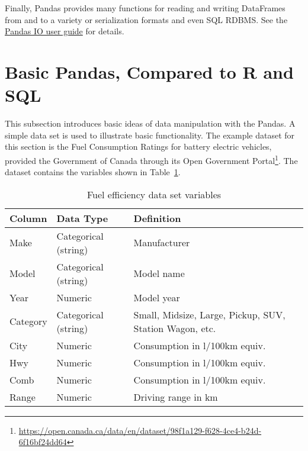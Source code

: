 



Finally, Pandas provides many functions for reading and writing DataFrames from and to a variety or serialization formats and even SQL RDBMS. See the \href{https://pandas.pydata.org/docs/user_guide/io.html#}{Pandas IO user guide} for details. 

\section{Basic Pandas, Compared to R and SQL}

This subsection introduces basic ideas of data manipulation with the Pandas. A simple data set is used to illustrate basic functionality. The example dataset for this section is the Fuel Consumption Ratings for battery electric vehicles, provided the Government of Canada through its Open Government Portal\footnote{\scriptsize\url{https://open.canada.ca/data/en/dataset/98f1a129-f628-4ce4-b24d-6f16bf24dd64}}. The dataset contains the variables shown in Table~\ref{tab:fueldatachapter6}.

\begin{table}[h]
\centering
\renewcommand{\arraystretch}{1.25}

\begin{tabularx}{.9\linewidth}{|l|l|X|} \hline
  {\bf Column} & {\bf Data Type} & {\bf Definition} \\ \hline \hline
  Make & Categorical (string) & Manufacturer \\ 
  Model & Categorical (string) & Model name\\
  Year & Numeric & Model year \\
  Category & Categorical (string) & Small, Midsize, Large, Pickup, SUV, Station Wagon, etc. \\
  City & Numeric & Consumption in l/100km equiv. \\
  Hwy & Numeric & Consumption in l/100km equiv. \\
  Comb & Numeric & Consumption in l/100km equiv. \\
  Range & Numeric & Driving range in km \\ \hline
\end{tabularx}
\caption{Fuel efficiency data set variables}
\label{tab:fueldatachapter6}
\end{table}

